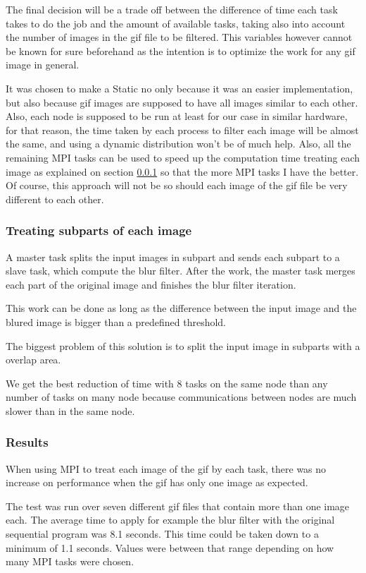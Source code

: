 \documentclass[conference,compsoc]{IEEEtran}
\begin{document}
The final decision will be a trade off between the difference of time each task takes to do the job and the amount of available tasks, taking also into account the number of images in the gif file to be filtered. This variables however cannot be known for sure beforehand as the intention is to optimize the work for any gif image in general.

It was chosen to make a Static no only because it was an easier implementation, but also because gif images are supposed to have all images similar to each other. Also, each node is supposed to be run at least for our case in similar hardware, for that reason, the time taken by each process to filter each image will be almost the same, and using a dynamic distribution won't be of much help. 
Also, all the remaining MPI tasks can be used to speed up the computation time treating each image as explained on section \ref{sec:treating_subparts} so that the more MPI tasks I have the better.
Of course, this approach will not be so should each image of the gif file be very different to each other.

\subsubsection{Treating subparts of each image} \label{sec:treating_subparts}
A master task splits the input images in subpart and sends each subpart to a slave task, which compute the blur filter.
After the work, the master task merges each part of the original image and finishes the blur filter iteration.

This work can be done as long as the difference between the input image and the blured image is bigger than a predefined threshold.

The biggest problem of this solution is to split the input image in subparts with a overlap area.

We get the best reduction of time with 8 tasks on the same node than any number of tasks on many node because communications between nodes are much slower than in the same node.

\subsubsection{Results}
When using MPI to treat each image of the gif by each task, there was no increase on performance when the gif has only one image as expected. 

The test was run over seven different gif files that contain more than one image each. The average time to apply for example the blur filter with the original sequential program was 8.1 seconds. This time could be taken down to a minimum of 1.1 seconds. Values were between that range depending on how many MPI tasks were chosen.
\end{document}

